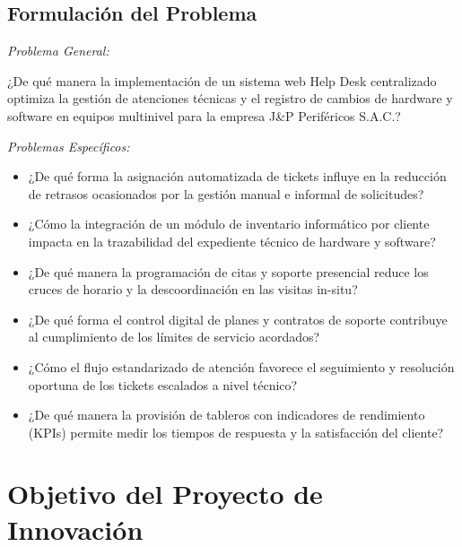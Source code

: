 \subsection{Formulación del Problema}

\noindent \textit{Problema General:}

\vspace{0.5em}

¿De qué manera la implementación de un sistema web Help Desk centralizado optimiza la gestión de atenciones técnicas y el registro de cambios de hardware y software en equipos multinivel para la empresa J\&P Periféricos S.A.C.?

\vspace{1.2em}

\noindent \textit{Problemas Específicos:}

\begin{itemize}[leftmargin=1.27cm]
 \item ¿De qué forma la asignación automatizada de tickets influye en la reducción de retrasos ocasionados por la gestión manual e informal de solicitudes?
 
 \item ¿Cómo la integración de un módulo de inventario informático por cliente impacta en la trazabilidad del expediente técnico de hardware y software?
 
 \item ¿De qué manera la programación de citas y soporte presencial reduce los cruces de horario y la descoordinación en las visitas in-situ?
 
 \item ¿De qué forma el control digital de planes y contratos de soporte contribuye al cumplimiento de los límites de servicio acordados?
 
 \item ¿Cómo el flujo estandarizado de atención favorece el seguimiento y resolución oportuna de los tickets escalados a nivel técnico?
 
 \item ¿De qué manera la provisión de tableros con indicadores de rendimiento (KPIs) permite medir los tiempos de respuesta y la satisfacción del cliente?
\end{itemize}

\newpage

\section{Objetivo del Proyecto de Innovación}

